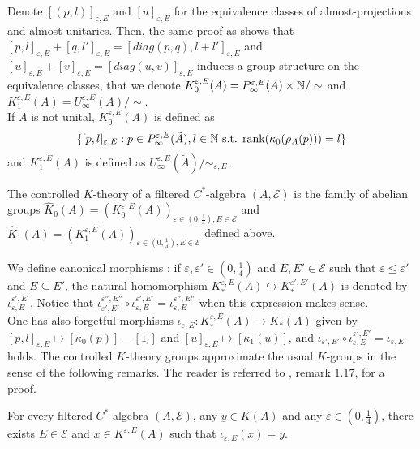 Denote $[(p,l)]_{\varepsilon,E}$ and $[u]_{\varepsilon,E}$ for the equivalence classes of almost-projections and almost-unitaries. Then, the same proof as \cite{OY2} shows that $[p,l]_{\varepsilon,E}+[q,l']_{\varepsilon,E}=[diag(p,q),l+l']_{\varepsilon,E}$ and $[u]_{\varepsilon,E}+[v]_{\varepsilon,E}=[diag(u,v)]_{\varepsilon,E}$ induces a group structure on the equivalence classes, that we denote $K_0^{\varepsilon,E}(A) = P^{\varepsilon, E}_\infty(A)\times \mathbb N / \sim$ and $K_1^{\varepsilon,E}(A) = U^{\varepsilon, E}_\infty(A) / \sim$.\\

If $A$ is not unital, $K_0^{\varepsilon,E}(A)$ is defined as
\[\{[p,l]_{\varepsilon,E} : p\in P^{\varepsilon,E}_\infty (\tilde A), l\in \mathbb N \text{ s.t. rank}(\kappa_0(\rho_A(p)))=l \}\]
and $K_1^{\varepsilon,E}(A)$ is defined as $U_\infty^{\varepsilon,E}(\tilde A)/ \sim_{\varepsilon,E}$.\\

\begin{definition}
The controlled $K$-theory of a filtered $C^*$-algebra $(A,\mathcal E)$ is the family of abelian groups $\hat K_0(A) = (K_0^{\varepsilon,E}(A))_{\varepsilon\in (0,\frac{1}{4}),E\in\mathcal E}$ and $\hat K_1(A) = (K_1^{\varepsilon,E}(A))_{\varepsilon\in (0,\frac{1}{4}),E\in\mathcal E}$ defined above.\\
\end{definition}

We define canonical morphisms : if $\varepsilon, \varepsilon'\in (0,\frac{1}{4})$ and $E,E'\in\mathcal E$ such that $\varepsilon \leq \varepsilon'$ and $E \subseteq E'$, the natural homomorphism $K_*^{\varepsilon,E}(A)\hookrightarrow K_*^{\varepsilon',E'}(A)$ is denoted by $\iota_{\varepsilon,E}^{\varepsilon',E'}$. Notice that $\iota_{\varepsilon',E'}^{\varepsilon'',E''}\circ\iota_{\varepsilon,E}^{\varepsilon',E'}=\iota_{\varepsilon,E}^{\varepsilon'',E''}$ when this expression makes sense.\\

One has also forgetful morphisms $\iota_{\varepsilon,E} : K_*^{\varepsilon,E}(A)\rightarrow K_*(A)$ given by $[p,l]_{\varepsilon,E} \mapsto [\kappa_0(p)]-[1_l]$ and $[u]_{\varepsilon,E} \mapsto [\kappa_1(u)] $, and 
$\iota_{\varepsilon',E'}\circ\iota_{\varepsilon,E}^{\varepsilon',E'}=\iota_{\varepsilon, E}$ holds. The controlled $K$-theory groups approximate the usual $K$-groups in the sense of the following remarks. The reader is referred to \cite{OY2}, remark $1.17$, for a proof.

\begin{rk}
For every filtered $C^*$-algebra $(A,\mathcal E)$, any $y\in K(A)$ and any $\varepsilon\in (0,\frac{1}{4})$, there exists $E\in\mathcal E$ and $x\in K^{\varepsilon,E}(A)$ such that $\iota_{\varepsilon,E}(x) = y$.
\end{rk}

